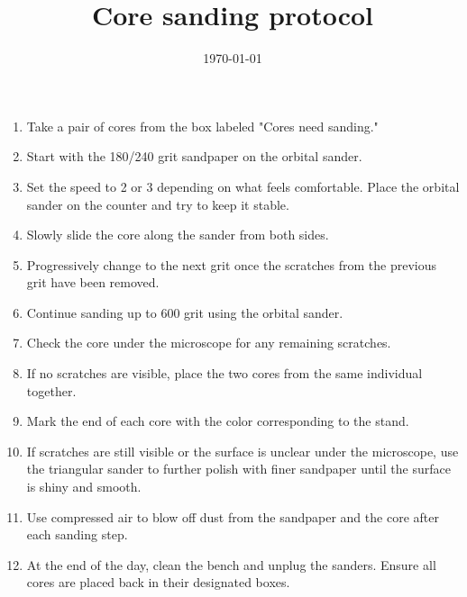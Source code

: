 \documentclass[11pt,letter]{article}
\begin{document}
\title{Core sanding protocol} 
\date{\today}
\maketitle

\setlength{\parindent}{0pt}
\setlength{\parskip}{3pt}
\begin{enumerate}
\item Take a pair of cores from the box labeled "Cores need sanding."
\item Start with the 180/240 grit sandpaper on the orbital sander.
\item Set the speed to 2 or 3 depending on what feels comfortable. Place the orbital sander on the counter and try to keep it stable.
\item Slowly slide the core along the sander from both sides.
\item Progressively change to the next grit once the scratches from the previous grit have been removed.
\item Continue sanding up to 600 grit using the orbital sander.
\item Check the core under the microscope for any remaining scratches.
\item If no scratches are visible, place the two cores from the same individual together.
\item Mark the end of each core with the color corresponding to the stand.
\item If scratches are still visible or the surface is unclear under the microscope, use the triangular sander to further polish with finer sandpaper until the surface is shiny and smooth.
\item Use compressed air to blow off dust from the sandpaper and the core after each sanding step.
\item At the end of the day, clean the bench and unplug the sanders. Ensure all cores are placed back in their designated boxes.
	\end{enumerate}
\end{document}
